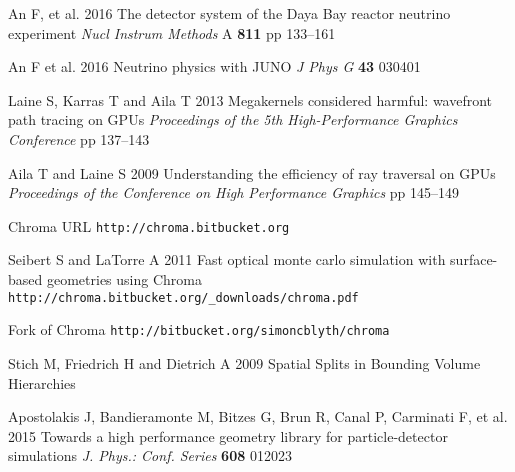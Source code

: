 \documentclass[a4paper]{jpconf}
\begin{document}
\begin{thebibliography}{9}
An F, et al.
2016
The detector system of the Daya Bay reactor neutrino experiment
{\it Nucl Instrum Methods} A {\bf 811} pp 133--161

An F et al.  
2016
Neutrino physics with JUNO
{\it J Phys G} {\bf 43} 030401















Laine S, Karras T and Aila T
2013
Megakernels considered harmful: wavefront path tracing on GPUs
{\it Proceedings of the 5th High-Performance Graphics Conference} pp 137--143

Aila T and Laine S 
2009
Understanding the efficiency of ray traversal on GPUs
{\it Proceedings of the Conference on High Performance Graphics} pp 145--149



Chroma URL {\tt http://chroma.bitbucket.org}

Seibert S and LaTorre A 
2011 
Fast optical monte carlo simulation with surface-based geometries using Chroma {\tt http://chroma.bitbucket.org/\_downloads/chroma.pdf}

Fork of Chroma {\tt http://bitbucket.org/simoncblyth/chroma}





















Stich M, Friedrich H and Dietrich A 
2009
Spatial Splits in Bounding Volume Hierarchies







Apostolakis J, Bandieramonte M, Bitzes G, Brun R, Canal P, Carminati F, et al. 
2015
Towards a high performance geometry library for particle-detector simulations
{\it J. Phys.: Conf. Series} {\bf 608} 012023


\end{thebibliography}
\end{document}
